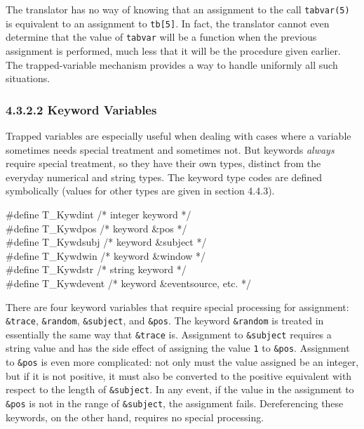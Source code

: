 The translator has no way of knowing that an assignment to the call
\texttt{tabvar(5)} is equivalent to an assignment to \texttt{tb[5]}. In
fact, the translator cannot even determine that the value of
\texttt{tabvar} will be a function when the previous assignment is
performed, much less that it will be the procedure given earlier.
The trapped-variable mechanism provides a way to handle
uniformly all such situations.

\subsubsection[4.3.2.2 Keyword Variables]{4.3.2.2 Keyword Variables}
Trapped variables are especially useful when dealing with cases where a
variable sometimes needs special treatment and sometimes not. But keywords
{\em always} require special treatment, so they have their own types,
distinct from the everyday numerical and string types. The keyword type
codes are defined symbolically (values for other types are given in
section 4.4.3).

\begin{iconcode}
\#define \>\>\>T\_Kywdint	\>\>\>\>\>\> \>\>\>\>/* integer keyword */\\
\#define \>\>\>T\_Kywdpos	\>\>\>\>\>\> \>\>\>\>/* keyword \&pos */\\
\#define \>\>\>T\_Kywdsubj  \>\>\>\>\>\> \>\>\>\>/* keyword \&subject */\\
\#define \>\>\>T\_Kywdwin	\>\>\>\>\>\> \>\>\>\>/* keyword \&window */\\
\#define \>\>\>T\_Kywdstr	\>\>\>\>\>\> \>\>\>\>/* string keyword */\\
\#define \>\>\>T\_Kywdevent \>\>\>\>\>\> \>\>\>\>/* keyword \&eventsource, etc. */
\end{iconcode}

There are four keyword variables that require special processing for
assignment: \texttt{\&trace}, \texttt{\&random}, \texttt{\&subject},
and \texttt{\&pos}. The keyword \texttt{\&random} is treated in
essentially the same way that \texttt{\&trace} is. Assignment to
\texttt{\&subject} requires a string value and has the side effect of
assigning the value \texttt{1} to \texttt{\&pos}. Assignment to
\texttt{\&pos} is even more complicated: not only must the value
assigned be an integer, but if it is not positive, it must also be
converted to the positive equivalent with respect to the length of
\texttt{\&subject}. In any event, if the value in the assignment to
\texttt{\&pos} is not in the range of \texttt{\&subject}, the
assignment fails. Dereferencing these keywords, on the other hand,
requires no special processing.

